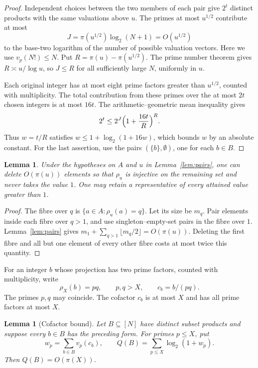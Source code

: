 \documentclass[11pt]{article}
\numberwithin{equation}{section}
\newtheorem{lemma}[theorem]{Lemma}
\theoremstyle{remark}
\begin{document}
\begin{proof}
Independent choices between the two members of each pair give $2^t$ distinct products with the same valuations above $u$. The primes at most $u^{1/2}$ contribute at most
\[
J=\pi(u^{1/2})\log_2(N+1)=O(u^{1/2})
\]
to the base-two logarithm of the number of possible valuation vectors. Here we use $v_p(N!)\le N$. Put $R=\pi(u)-\pi(u^{1/2})$. The prime number theorem gives $R\asymp u/\log u$, so $J\le R$ for all sufficiently large $N$, uniformly in $u$.

Each original integer has at most eight prime factors greater than $u^{1/2}$, counted with multiplicity. The total contribution from these primes over the at most $2t$ chosen integers is at most $16t$. The arithmetic--geometric mean inequality gives
\[
2^t\le2^J\Bigl(1+\frac{16t}R\Bigr)^R.
\]
Thus $w=t/R$ satisfies $w\le1+\log_2(1+16w)$, which bounds $w$ by an absolute constant. For the last assertion, use the pairs $(\{b\},\emptyset)$, one for each $b\in B$.
\end{proof}

\begin{lemma}\label{lem:inj}
Under the hypotheses on $A$ and $u$ in Lemma~\ref{lem:pairs}, one can delete $O(\pi(u))$ elements so that $\rho_u$ is injective on the remaining set and never takes the value $1$. One may retain a representative of every attained value greater than $1$.
\end{lemma}

\begin{proof}
The fibre over $q$ is $\{a\in A:\rho_u(a)=q\}$. Let its size be $m_q$. Pair elements inside each fibre over $q>1$, and use singleton--empty-set pairs in the fibre over $1$. Lemma~\ref{lem:pairs} gives $m_1+\sum_{q>1}\lfloor m_q/2\rfloor=O(\pi(u))$. Deleting the first fibre and all but one element of every other fibre costs at most twice this quantity.
\end{proof}

For an integer $b$ whose projection has two prime factors, counted with multiplicity, write
\[
\rho_X(b)=pq,\qquad p,q>X,\qquad c_b=b/(pq).
\]
The primes $p,q$ may coincide. The cofactor $c_b$ is at most $X$ and has all prime factors at most $X$.

\begin{lemma}[Cofactor bound]\label{lem:cofactor}
Let $B\subseteq[N]$ have distinct subset products and suppose every $b\in B$ has the preceding form. For primes $p\le X$, put
\[
w_p=\sum_{b\in B}v_p(c_b),\qquad Q(B)=\sum_{p\le X}\log_2(1+w_p).
\]
Then $Q(B)=O(\pi(X))$.
\end{lemma}
\end{document}
